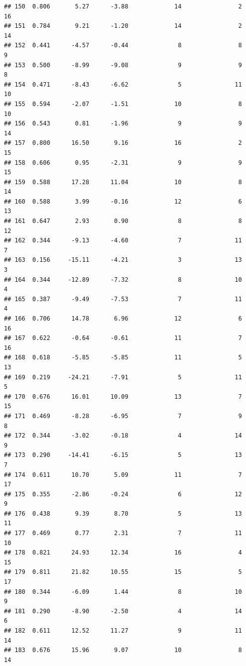\documentclass[]{book}
\begin{document}
\begin{verbatim}
## 150  0.806       5.27      -3.88             14                2       16
## 151  0.784       9.21      -1.20             14                2       14
## 152  0.441      -4.57      -0.44              8                8        9
## 153  0.500      -8.99      -9.08              9                9        8
## 154  0.471      -8.43      -6.62              5               11       10
## 155  0.594      -2.07      -1.51             10                8       10
## 156  0.543       0.81      -1.96              9                9       14
## 157  0.800      16.50       9.16             16                2       15
## 158  0.606       0.95      -2.31              9                9       15
## 159  0.588      17.28      11.04             10                8       14
## 160  0.588       3.99      -0.16             12                6       13
## 161  0.647       2.93       0.90              8                8       12
## 162  0.344      -9.13      -4.60              7               11        7
## 163  0.156     -15.11      -4.21              3               13        3
## 164  0.344     -12.89      -7.32              8               10        4
## 165  0.387      -9.49      -7.53              7               11        4
## 166  0.706      14.78       6.96             12                6       16
## 167  0.622      -0.64      -0.61             11                7       16
## 168  0.618      -5.85      -5.85             11                5       13
## 169  0.219     -24.21      -7.91              5               11        5
## 170  0.676      16.01      10.09             13                7       15
## 171  0.469      -8.28      -6.95              7                9        8
## 172  0.344      -3.02      -0.18              4               14        9
## 173  0.290     -14.41      -6.15              5               13        7
## 174  0.611      10.70       5.09             11                7       17
## 175  0.355      -2.86      -0.24              6               12        9
## 176  0.438       9.39       8.70              5               13       11
## 177  0.469       0.77       2.31              7               11       10
## 178  0.821      24.93      12.34             16                4       15
## 179  0.811      21.82      10.55             15                5       17
## 180  0.344      -6.09       1.44              8               10        9
## 181  0.290      -8.90      -2.50              4               14        6
## 182  0.611      12.52      11.27              9               11       14
## 183  0.676      15.96       9.07             10                8       14

\end{verbatim}
\end{document}
